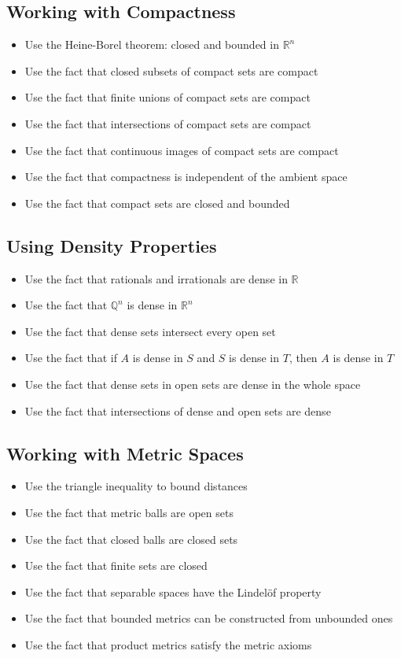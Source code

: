 \subsection*{Working with Compactness}
\begin{itemize}
\item Use the Heine-Borel theorem: closed and bounded in $\mathbb{R}^n$
\item Use the fact that closed subsets of compact sets are compact
\item Use the fact that finite unions of compact sets are compact
\item Use the fact that intersections of compact sets are compact
\item Use the fact that continuous images of compact sets are compact
\item Use the fact that compactness is independent of the ambient space
\item Use the fact that compact sets are closed and bounded
\end{itemize}

\subsection*{Using Density Properties}
\begin{itemize}
\item Use the fact that rationals and irrationals are dense in $\mathbb{R}$
\item Use the fact that $\mathbb{Q}^n$ is dense in $\mathbb{R}^n$
\item Use the fact that dense sets intersect every open set
\item Use the fact that if $A$ is dense in $S$ and $S$ is dense in $T$, then $A$ is dense in $T$
\item Use the fact that dense sets in open sets are dense in the whole space
\item Use the fact that intersections of dense and open sets are dense
\end{itemize}

\subsection*{Working with Metric Spaces}
\begin{itemize}
\item Use the triangle inequality to bound distances
\item Use the fact that metric balls are open sets
\item Use the fact that closed balls are closed sets
\item Use the fact that finite sets are closed
\item Use the fact that separable spaces have the Lindelöf property
\item Use the fact that bounded metrics can be constructed from unbounded ones
\item Use the fact that product metrics satisfy the metric axioms
\end{itemize}

